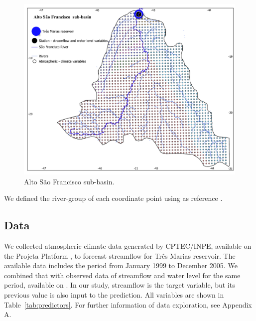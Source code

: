 \documentclass[12pt]{article}
\begin{document}
\begin{figure}[htbp]
    \centering
    \includegraphics[width=0.9\linewidth]{Figures/mapa.pdf}
    \caption{Alto São Francisco sub-basin.}
    \label{fig:studyarea}
\end{figure}

We defined the river-group of each coordinate point using as reference \cite{fundep}.

\subsection{Data}

We collected atmospheric climate data generated by CPTEC/INPE, available on the Projeta Platform \cite{chou2014assessment,chou2014evaluation,Lyra2018}, to forecast streamflow for Três Marias reservoir. The available data includes the period from January 1999 to December 2005. We combined that with observed data of streamflow and water level for the same period, available on \cite{onsnivel,onsvazao}. In our study, streamflow is the target variable, but its previous value is also input to the prediction. All variables are shown in Table~\ref{tab:predictors}. For further information of data exploration, see Appendix A.
\end{document}
